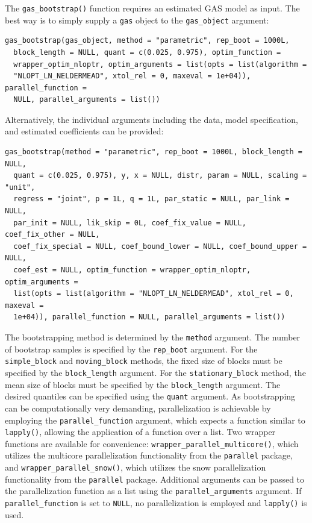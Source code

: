The \texttt{gas\_bootstrap()} function requires an estimated GAS model as input. The best way is to simply supply a \texttt{gas} object to the \texttt{gas\_object} argument:

\begin{verbatim}
gas_bootstrap(gas_object, method = "parametric", rep_boot = 1000L, 
  block_length = NULL, quant = c(0.025, 0.975), optim_function = 
  wrapper_optim_nloptr, optim_arguments = list(opts = list(algorithm = 
  "NLOPT_LN_NELDERMEAD", xtol_rel = 0, maxeval = 1e+04)), parallel_function =
  NULL, parallel_arguments = list())
\end{verbatim}

Alternatively, the individual arguments including the data, model specification, and estimated coefficients can be provided:

\begin{verbatim}
gas_bootstrap(method = "parametric", rep_boot = 1000L, block_length = NULL,
  quant = c(0.025, 0.975), y, x = NULL, distr, param = NULL, scaling = "unit",
  regress = "joint", p = 1L, q = 1L, par_static = NULL, par_link = NULL,
  par_init = NULL, lik_skip = 0L, coef_fix_value = NULL, coef_fix_other = NULL,
  coef_fix_special = NULL, coef_bound_lower = NULL, coef_bound_upper = NULL,
  coef_est = NULL, optim_function = wrapper_optim_nloptr, optim_arguments = 
  list(opts = list(algorithm = "NLOPT_LN_NELDERMEAD", xtol_rel = 0, maxeval = 
  1e+04)), parallel_function = NULL, parallel_arguments = list())
\end{verbatim}

The bootstrapping method is determined by the \texttt{method} argument. The number of bootstrap samples is specified by the \texttt{rep\_boot} argument. For the \texttt{simple\_block} and \texttt{moving\_block} methods, the fixed size of blocks must be specified by the \texttt{block\_length} argument. For the \texttt{stationary\_block} method, the mean size of blocks must be specified by the \texttt{block\_length} argument. The desired quantiles can be specified using the \texttt{quant} argument. As bootstrapping can be computationally very demanding, parallelization is achievable by employing the \texttt{parallel\_function} argument, which expects a function similar to \texttt{lapply()}, allowing the application of a function over a list. Two wrapper functions are available for convenience: \texttt{wrapper\_parallel\_multicore()}, which utilizes the multicore parallelization functionality from the \texttt{parallel} package, and \texttt{wrapper\_parallel\_snow()}, which utilizes the snow parallelization functionality from the \texttt{parallel} package. Additional arguments can be passed to the parallelization function as a list using the \texttt{parallel\_arguments} argument. If \texttt{parallel\_function} is set to \texttt{NULL}, no parallelization is employed and \texttt{lapply()} is used.

